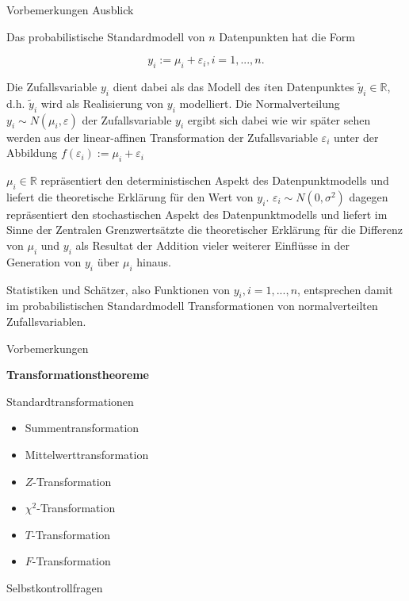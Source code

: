 \documentclass[
  8pt,
  ignorenonframetext,
]{beamer}
\providecommand{\tightlist}{%
  \setlength{\itemsep}{0pt}\setlength{\parskip}{0pt}}
\begin{document}
\begin{frame}{Vorbemerkungen}
\protect\hypertarget{vorbemerkungen-8}{}
Ausblick

\footnotesize

Das probabilistische Standardmodell von \(n\) Datenpunkten hat die Form

\begin{equation}
y_i := \mu_i + \varepsilon_i, i = 1,...,n.
\end{equation}

Die Zufallsvariable \(y_i\) dient dabei als das Modell des \(i\)ten
Datenpunktes \(\tilde{y}_i \in \mathbb{R}\), d.h. \(\tilde{y}_i\) wird
als Realisierung von \(y_i\) modelliert. Die Normalverteilung
\(y_i \sim N(\mu_i,\varepsilon)\) der Zufallsvariable \(y_i\) ergibt
sich dabei wie wir später sehen werden aus der linear-affinen
Transformation der Zufallsvariable \(\varepsilon_i\) unter der Abbildung
\(f(\varepsilon_i) := \mu_i + \varepsilon_i\)

\(\mu_i \in \mathbb{R}\) repräsentiert den deterministischen Aspekt des
Datenpunktmodells und liefert die theoretische Erklärung für den Wert
von \(y_i\). \(\varepsilon_i \sim N(0,\sigma^2)\) dagegen repräsentiert
den stochastischen Aspekt des Datenpunktmodells und liefert im Sinne der
Zentralen Grenzwertsätzte die theoretischer Erklärung für die Differenz
von \(\mu_i\) und \(y_i\) als Resultat der Addition vieler weiterer
Einflüsse in der Generation von \(y_i\) über \(\mu_i\) hinaus.

Statistiken und Schätzer, also Funktionen von \(y_i, i = 1,...,n\),
entsprechen damit im probabilistischen Standardmodell Transformationen
von normalverteilten Zufallsvariablen.
\end{frame}

\begin{frame}{}
\protect\hypertarget{section-4}{}
\large

Vorbemerkungen

\textbf{Transformationstheoreme}

Standardtransformationen

\normalsize

\begin{itemize}
\tightlist
\item
  Summentransformation
\item
  Mittelwerttransformation
\item
  \(Z\)-Transformation
\item
  \(\chi^2\)-Transformation
\item
  \(T\)-Transformation
\item
  \(F\)-Transformation
\end{itemize}

\large

Selbstkontrollfragen
\end{frame}
\end{document}
